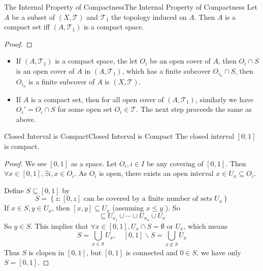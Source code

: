 \documentclass[../main.tex]{subfiles}
\begin{document}
\begin{theorem}{The Internal Property of Compactness}{The Internal Property of Compactness}
Let $A$ be a subset of $(X,\mathcal{T})$ and $\mathcal{T}_1$ the topology induced on $A$. Then $A$ is a compact set iff $(A,\mathcal{T}_1)$ is a compact space.
\end{theorem}
\begin{proof}

\end{proof}
\begin{itemize}
\item If $(A,\mathcal{T}_1)$ is a compact space, the let $O_i$ be an open cover of $A$, then $O_i \cap S$ is an open cover of $A$ in $(A,\mathcal{T}_1)$, which has a finite subcover $O_{i_n}\cap S$, then $O_{i_n}$ is a finite subcover of $A$ is $(X,\mathcal{T})$.
\item If $A$ is a compact set, then for all open cover of $(A, \mathcal{T}_1)$, similarly we have $O_i' = O_i\cap S$ for some open set  $O_i \in \mathcal{T}$. The next step proceeds the same as above.
\end{itemize}
\begin{proposition}{Closed Interval is Compact}{Closed Interval is Compact}
	The closed interval $[0,1]$ is compact.
\end{proposition}
\begin{proof}
	We see $[0,1]$ as a space. Let $O_i,i\in I$ be any covering of $[0,1]$. Then $\forall x\in [0,1], \exists i,x\in O_i$. As $O_i$ is open, there exists an open interval $x\in U_x \subseteq O_i$.

	Define $S \subseteq [0,1]$ by
	\begin{equation*}
		S = \left\{ z:[0,z] \text{ can be covered by a finite number of sets }U_x \right\}
	\end{equation*}
	If $x\in S,y\in U_x$, then $[x,y] \subseteq U_x$ (assuming $x \leq y$ ). So
	\begin{equation*}
		[0,y] \subseteq U_{x_1} \cup \cdots \cup U_{x_n}\cup U_x
	\end{equation*}
	So $y\in S$. This implies that $\forall x\in [0,1], U_x\cap S = \emptyset $ or $U_x$, which means
	\begin{equation*}
		S = \bigcup_{x\in S} U_x, \quad [0,1] \backslash S = \bigcup_{x\notin S} U_x 
	\end{equation*}
	Thus $S$ is clopen in $[0,1]$, but $[0,1]$ is connected and $0\in S$, we have only $S = [0,1]$.
\end{proof}
\end{document}
